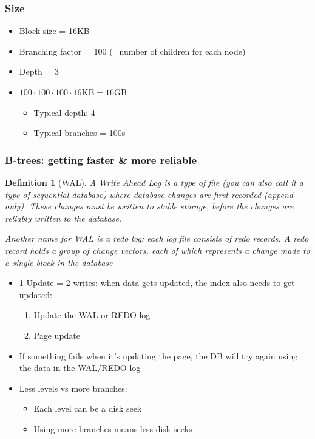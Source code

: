 \documentclass{article}
\newtheorem{theorem}{Definition}[section]
\begin{document}
\subsubsection{Size}

\begin{itemize}
    \item Block size = 16KB
    \item Branching factor = 100 (=number of children for each node)
    \item Depth = 3
    \item $100 \cdot 100 \cdot 100 \cdot 16\text{KB} = 16\text{GB}$
    \begin{itemize}
        \item Typical depth: 4
        \item Typical branches = 100s
    \end{itemize}
\end{itemize}

\subsubsection{B-trees: getting faster \& more reliable}

\begin{theorem}[WAL]
    A Write Ahead Log is a type of file (you can also call it a type of sequential database) where database changes are first recorded (append-only).
    These changes must be written to stable storage, before the changes are reliably written to the database.

    Another name for WAL is a redo log: each log file consists of redo records. A redo record holds a group of change vectors, each of which represents a change made to a single block in the database
\end{theorem}

\begin{itemize}
    \item 1 Update = 2 writes: when data gets updated, the index also needs to get updated:
    \begin{enumerate}
        \item Update the WAL or REDO log
        \item Page update
    \end{enumerate}
    \item If something fails when it's updating the page, the DB will try again using the data in the WAL/REDO log
    \item Less levels vs more branches:
    \begin{itemize}
        \item Each level can be a disk seek
        \item Using more branches means less disk seeks
    \end{itemize}
\end{itemize}
\end{document}
